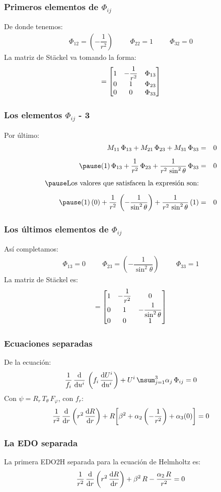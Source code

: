\documentclass[12pt]{beamer}
\begin{document}
\begin{frame}
\frametitle{Primeros elementos de $\Phi_{ij}$}
De donde tenemos:
\pause
\begin{align*}
\Phi_{12} = \left( - \dfrac{1}{r^{2}} \right) \hspace{1cm} \Phi_{22} = 1 \hspace{1cm} \Phi_{32} = 0 
\end{align*}
\pause
La matriz de Stäckel va tomando la forma:
\pause
\begin{align*}
[S] = \mqty[
1 & - \dfrac{1}{r^{2}} & \Phi_{13} \\
0 & 1 & \Phi_{23} \\
0 & 0 & \Phi_{33}
]
\end{align*}  
\end{frame}
\begin{frame}
\frametitle{Los elementos $\Phi_{ij}$ - 3}
Por último:
\pause
\begin{eqnarray*}
M_{11} \, \Phi_{13} + M_{21} \, \Phi_{23} + M_{31} \, \Phi_{33} &=& 0 \\[0.5em] \pause
(1) \, \Phi_{13} + \dfrac{1}{r^{2}} \, \Phi_{23} + \dfrac{1}{r^{2} \, \sin^{2} \theta}  \, \Phi_{33} &=& 0 \\[0.5em] \pause
\mbox{Los valores que satisfacen la expresión son:} \\[0.5em] \pause
(1) \, (0) + \dfrac{1}{r^{2}} \, \left( - \dfrac{1}{\sin^{2} \theta} \right) + \dfrac{1}{r^{2} \, \sin^{2} \theta} \, (1) &=& 0
\end{eqnarray*}
\end{frame}
\begin{frame}
\frametitle{Los últimos elementos de $\Phi_{ij}$}
Así completamos:
\pause
\begin{align*}
\Phi_{13} = 0 \hspace{1cm} \Phi_{23} = \left( - \dfrac{1}{\sin^{2} \theta} \right) \hspace{1cm} \Phi_{33} = 1 
\end{align*}
\pause
La matriz de Stäckel es:
\pause
\begin{align*}
[S] = \mqty[
1 & - \dfrac{1}{r^{2}} & 0 \\
0 & 1 & - \dfrac{1}{\sin^{2} \theta} \\
0 & 0 & 1
]
\end{align*}  
\end{frame}
\begin{frame}
\frametitle{Ecuaciones separadas}
De la ecuación:
\begin{align*}
\dfrac{1}{f_{i}} \, \dv{u^{i}} \, \left( f_{i} \, \dv{U^{i}}{u^{i}} \right) + U^{i} \, \nsum_{j=1}^{3} \alpha_{j} \, \Phi_{ij} = 0
\end{align*}
\pause
Con $\psi = R_{r} \, T_{\theta} \, F_{\varphi}$, con $f_{r}$:
\pause
\begin{align*}
\dfrac{1}{r^{2}} \, \dv{r} \left( r^{2} \, \dv{R}{r} \right) + R \bigg[ \beta^{2} + \alpha_{2} \left( - \dfrac{1}{r^{2}} \right) + \alpha_{3} (0) \bigg] = 0
\end{align*}
\end{frame}
\begin{frame}
\frametitle{La EDO separada}
La primera EDO2H separada para la ecuación de Helmholtz es:
\begin{align*}
\dfrac{1}{r^{2}} \, \dv{r} \left( r^{2} \, \dv{R}{r} \right) +  \beta^{2} \, R - \dfrac{\alpha_{2} \, R}{r^{2}} = 0
\end{align*}  
\end{frame}
\end{document}
